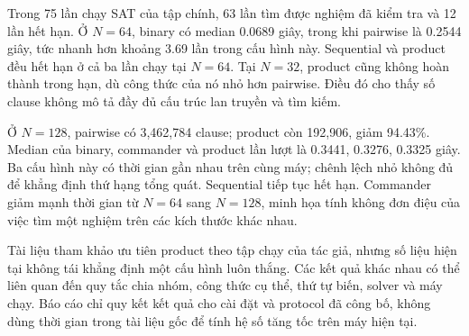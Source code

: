 Trong 75 lần chạy SAT của tập chính, 63 lần tìm được nghiệm đã kiểm tra và 12 lần hết hạn. Ở $N=64$, binary có median 0.0689 giây, trong khi pairwise là 0.2544 giây, tức nhanh hơn khoảng 3.69 lần trong cấu hình này. Sequential và product đều hết hạn ở cả ba lần chạy tại $N=64$. Tại $N=32$, product cũng không hoàn thành trong hạn, dù công thức của nó nhỏ hơn pairwise. Điều đó cho thấy số clause không mô tả đầy đủ cấu trúc lan truyền và tìm kiếm.

Ở $N=128$, pairwise có 3,462,784 clause; product còn 192,906, giảm 94.43\%. Median của binary, commander và product lần lượt là 0.3441, 0.3276, 0.3325 giây. Ba cấu hình này có thời gian gần nhau trên cùng máy; chênh lệch nhỏ không đủ để khẳng định thứ hạng tổng quát. Sequential tiếp tục hết hạn. Commander giảm mạnh thời gian từ $N=64$ sang $N=128$, minh họa tính không đơn điệu của việc tìm một nghiệm trên các kích thước khác nhau.

Tài liệu tham khảo \cite{bach2024} ưu tiên product theo tập chạy của tác giả, nhưng số liệu hiện tại không tái khẳng định một cấu hình luôn thắng. Các kết quả khác nhau có thể liên quan đến quy tắc chia nhóm, công thức cụ thể, thứ tự biến, solver và máy chạy. Báo cáo chỉ quy kết kết quả cho cài đặt và protocol đã công bố, không dùng thời gian trong tài liệu gốc để tính hệ số tăng tốc trên máy hiện tại.
